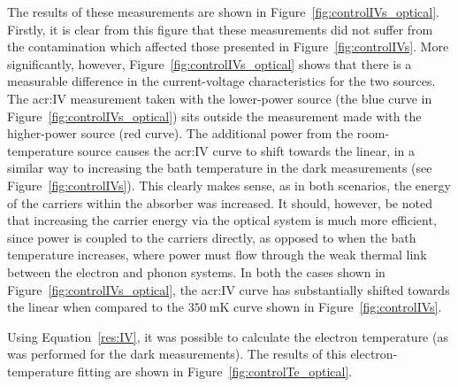 \par 
The results of these measurements are shown in Figure~\ref{fig:controlIVs_optical}. Firstly, it is clear from this figure that these measurements did not suffer from the contamination which affected those presented in Figure~\ref{fig:controlIVs}. More significantly, however, Figure~\ref{fig:controlIVs_optical} shows that there is a measurable difference in the current-voltage characteristics for the two sources. The \gls{acr:IV} measurement taken with the lower-power source (the blue curve in Figure~\ref{fig:controlIVs_optical}) sits outside the measurement made with the higher-power source (red curve). The additional power from the room-temperature source causes the \gls{acr:IV} curve to shift towards the linear, in a similar way to increasing the bath temperature in the dark measurements (see Figure~\ref{fig:controlIVs}). This clearly makes sense, as in both scenarios, the energy of the carriers within the absorber was increased. It should, however, be noted that increasing the carrier energy via the optical system is much more efficient, since power is coupled to the carriers directly, as opposed to when the bath temperature increases, where power must flow through the weak thermal link between the electron and phonon systems. In both the cases shown in Figure~\ref{fig:controlIVs_optical}, the \gls{acr:IV} curve has substantially shifted towards the linear when compared to the $350~\mathrm{mK}$ curve shown in Figure~\ref{fig:controlIVs}.
\par 
Using Equation~\ref{res:IV}, it was possible to calculate the electron temperature (as was performed for the dark measurements). The results of this electron-temperature fitting are shown in Figure~\ref{fig:controlTe_optical}.
